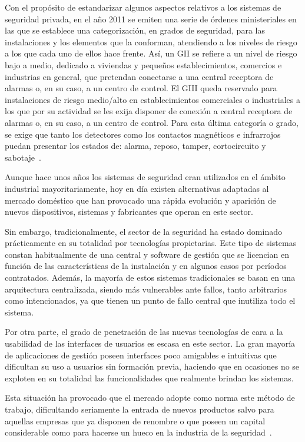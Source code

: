Con  el propósito  de estandarizar  algunos aspectos  relativos a  los
sistemas de seguridad  privada, en el año 2011 se  emiten una serie de
órdenes ministeriales en  las que se establece  una categorización, en
grados de  seguridad, para  las instalaciones y  los elementos  que la
conforman, atendiendo  a los niveles de  riesgo a los que  cada uno de
ellos hace frente. Así, un \acf{GII} se refiere a un nivel de riesgo bajo a medio, dedicado a viviendas y pequeños establecimientos, comercios e industrias en general, que pretendan conectarse a una central receptora de alarmas o, en su caso, a un centro de control. El \acf{GIII} queda reservado para instalaciones de riesgo medio/alto en establecimientos comerciales o industriales a los que por su actividad se les exija disponer de conexión a central receptora de alarmas o, en su caso, a un centro de control. Para esta última categoría o grado, se exige que tanto los detectores como los contactos magnéticos e infrarrojos puedan presentar los estados de: alarma, reposo, tamper, cortocircuito y sabotaje~\cite{BOE}.

Aunque hace unos años los sistemas de seguridad eran utilizados en el ámbito industrial mayoritariamente, hoy en día existen alternativas adaptadas al mercado doméstico que han provocado una rápida evolución y aparición de nuevos dispositivos, sistemas y fabricantes que operan en este sector. 

Sin embargo, tradicionalmente, el sector de la seguridad ha estado dominado prácticamente en su totalidad por tecnologías propietarias. Este tipo de sistemas constan habitualmente de una central y software de gestión que se licencian en función de las características de la instalación y en algunos casos por períodos contratados. Además, la mayoría de estos sistemas tradicionales se basan en una arquitectura centralizada, siendo más vulnerables ante fallos, tanto arbitrarios como intencionados, ya que tienen un punto de fallo central que inutiliza todo el sistema. 

Por otra parte,  el grado de penetración de las  nuevas tecnologías de
cara a la  usabilidad de las interfaces de usuarios  es escasa en este
sector. La gran  mayoría de aplicaciones de  gestión poseen interfaces
poco  amigables e  intuitivas que  dificultan  su uso  a usuarios  sin
formación  previa, haciendo  que en  ocasiones  no se  exploten en  su
totalidad las funcionalidades que realmente brindan los sistemas.

Esta situación ha provocado que el mercado adopte como norma este método de trabajo, dificultando seriamente la entrada de nuevos productos salvo para aquellas empresas que ya disponen de renombre o que poseen un capital considerable como para hacerse un hueco en la industria de la seguridad~\cite{garc2007hesperia}.


